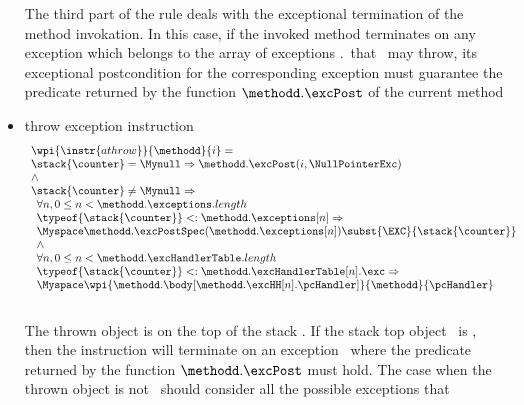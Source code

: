 \begin{itemize}
						The third part of the rule deals with the exceptional termination of the method invokation.
						In this case, if the invoked method terminates on any exception which belongs to the array of 
						exceptions \methodd.\exceptions \ that \methodd \ may throw, its exceptional postcondition
						for the corresponding exception
						must guarantee the predicate returned by the function $\methodd.\excPost$ of the current method

						
						
						
					
\item throw exception instruction \\
				
							$$ \begin{array}{l}
							          \wpi{\instr{athrow }} {\methodd}{i}  = \\
								    \stack{\counter} = \Mynull \Rightarrow  \methodd.\excPost( i, \NullPointerExc) \\  
								     \wedge \\
							          \stack{\counter} \neq \Mynull \Rightarrow \\
								    \begin{array}{l}  
								      \forall n, 0 \le n < \methodd. \exceptions.length \\  
								      \typeof{\stack{\counter}} <:  \methodd.\exceptions[n] \Rightarrow \\
								      \Myspace \methodd.\excPostSpec( \methodd.\exceptions[n]  )\subst{ \EXC }{\stack{\counter}  } \\
								      \wedge \\
								      \forall n, 0 \le n < \methodd.\excHandlerTable.length \\  
								      \typeof{\stack{\counter}} <: \methodd. \excHandlerTable[n].\exc \Rightarrow \\
								      \Myspace  \wpi{\methodd.\body[\methodd. \excHH[n].\pcHandler]}{\methodd}{\pcHandler}
								    \end{array} 
							   \end{array}
							$$ \\
						The thrown object is on the top of the stack \stack{\counter}.
						If the stack top object \stack{\counter} \ is \Mynull, then the instruction \athrow will terminate on an exception
						\NullPointerExc \ where the predicate returned by the function $ \methodd.\excPost$ must hold.
						The case when  the thrown object is not \Mynull \  should consider all the possible exceptions that

\end{itemize}
